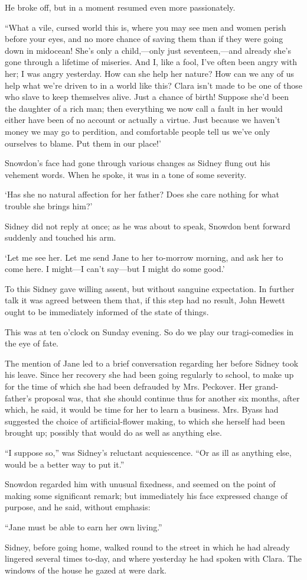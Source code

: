 He broke off, but in a moment resumed even more passionately.

``What a vile, cursed world this is, where you may see men and women
perish before your eyes, and no more chance of saving them than if they
were going down in midocean! She's only a child,---only just
seventeen,---and already she's gone through a lifetime of miseries. And
I, like a fool, I've {}often been angry with her; I was angry yesterday.
How can she help her nature? How can we any of us help what we're driven
to in a world like this? Clara isn't made to be one of those who slave
to keep themselves alive. Just a chance of birth! Suppose she'd been the
daughter of a rich man; then everything we now call a fault in her would
either have been of no account or actually a virtue. Just because we
haven't money we may go to perdition, and comfortable people tell us
we've only ourselves to blame. Put them in our place!'

Snowdon's face had gone through various changes as Sidney flung out his
vehement words. When he spoke, it was in a tone of some severity.

`Has she no natural affection for her father? Does she care nothing for
what trouble she brings him?'

Sidney did not reply at once; as he was about to speak, Snowdon bent
forward suddenly and touched his arm.

`Let me see her. Let me send Jane to {}her to-morrow morning, and ask
her to come here. I might---I can't say---but I might do some good.'

To this Sidney gave willing assent, but without sanguine expectation. In
further talk it was agreed between them that, if this step had no
result, John Hewett ought to be immediately informed of the state of
things.

This was at ten o'clock on Sunday evening. So do we play our
tragi-comedies in the eye of fate.

The mention of Jane led to a brief conversation regarding her before
Sidney took his leave. Since her recovery she had been going regularly
to school, to make up for the time of which she had been defrauded by
Mrs. Peckover. Her grand-father's proposal was, that she should continue
thus for another six months, after which, he said, it would be time for
her to learn a business. Mrs. Byass had suggested the choice of
artificial-flower making, to which she herself had been brought up;
possibly that would do as well as anything else.

{}``I suppose so,'' was Sidney's reluctant acquiescence. ``Or as ill as
anything else, would be a better way to put it.''

Snowdon regarded him with unusual fixedness, and seemed on the point of
making some significant remark; but immediately his face expressed
change of purpose, and he said, without emphasis:

``Jane must be able to earn her own living.''

Sidney, before going home, walked round to the street in which he had
already lingered several times to-day, and where yesterday he had spoken
with Clara. The windows of the house he gazed at were dark.
